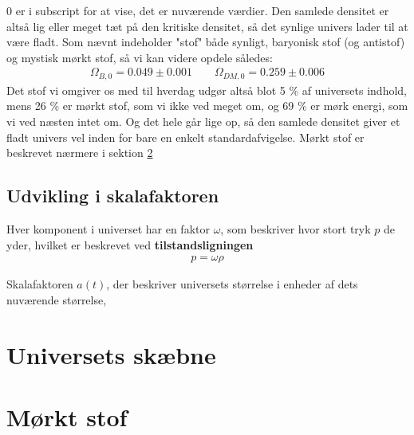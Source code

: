 0 er i subscript for at vise, det er nuværende værdier. Den samlede densitet er altså lig eller meget tæt på den kritiske densitet, så det synlige univers lader til at være fladt. Som nævnt indeholder "stof" både synligt, baryonisk stof (og antistof) og mystisk mørkt stof, så vi kan videre opdele således:
\begin{align}
\Omega_{B,0}=0.049\pm 0.001\qquad
\Omega_{DM,0}=0.259\pm 0.006
\end{align}
Det stof vi omgiver os med til hverdag udgør altså blot 5 \% af universets indhold, mens 26 \% er mørkt stof, som vi ikke ved meget om, og 69 \% er mørk energi, som vi ved næsten intet om. Og det hele går lige op, så den samlede densitet giver et fladt univers vel inden for bare en enkelt standardafvigelse. Mørkt stof er beskrevet nærmere i sektion \ref{DM}

\subsection{Udvikling i skalafaktoren}
Hver komponent i universet har en faktor $\omega$, som beskriver hvor stort tryk $p$ de yder, hvilket er beskrevet ved \textbf{tilstandsligningen}
\begin{align}
p=\omega \rho
\end{align}

Skalafaktoren $a(t)$, der beskriver universets størrelse i enheder af dets nuværende størrelse, 

\section{Universets skæbne}


\section{Mørkt stof} \label{DM}

